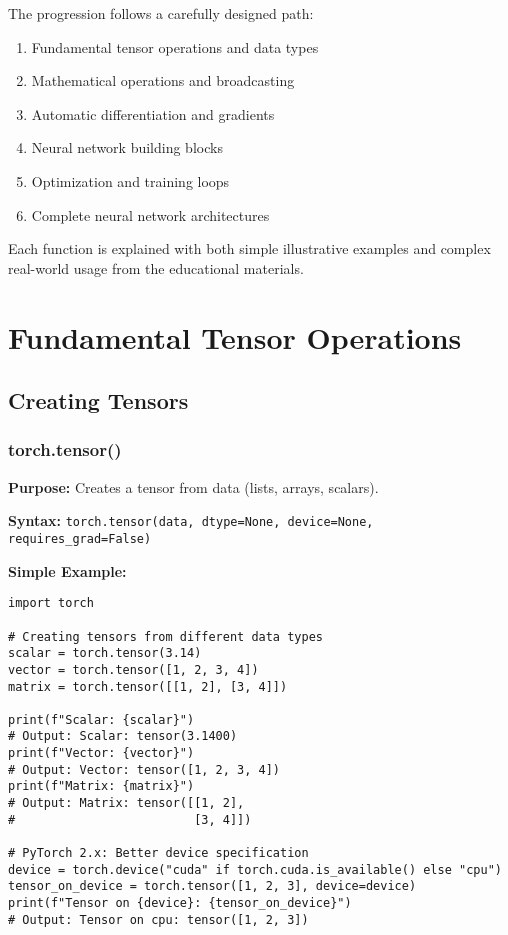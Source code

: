 \documentclass[11pt,a4paper]{book}
\begin{document}
The progression follows a carefully designed path:
\begin{enumerate}
\item Fundamental tensor operations and data types
\item Mathematical operations and broadcasting
\item Automatic differentiation and gradients
\item Neural network building blocks
\item Optimization and training loops
\item Complete neural network architectures
\end{enumerate}

Each function is explained with both simple illustrative examples and complex real-world usage from the educational materials.

\chapter{Fundamental Tensor Operations}

\section{Creating Tensors}

\subsection{torch.tensor()}

\textbf{Purpose:} Creates a tensor from data (lists, arrays, scalars).

\textbf{Syntax:} \texttt{torch.tensor(data, dtype=None, device=None, requires\_grad=False)}

\textbf{Simple Example:}
\begin{verbatim}
import torch

# Creating tensors from different data types
scalar = torch.tensor(3.14)
vector = torch.tensor([1, 2, 3, 4])
matrix = torch.tensor([[1, 2], [3, 4]])

print(f"Scalar: {scalar}")
# Output: Scalar: tensor(3.1400)
print(f"Vector: {vector}")  
# Output: Vector: tensor([1, 2, 3, 4])
print(f"Matrix: {matrix}")
# Output: Matrix: tensor([[1, 2],
#                         [3, 4]])

# PyTorch 2.x: Better device specification
device = torch.device("cuda" if torch.cuda.is_available() else "cpu")
tensor_on_device = torch.tensor([1, 2, 3], device=device)
print(f"Tensor on {device}: {tensor_on_device}")
# Output: Tensor on cpu: tensor([1, 2, 3])
\end{verbatim}
\end{document}
